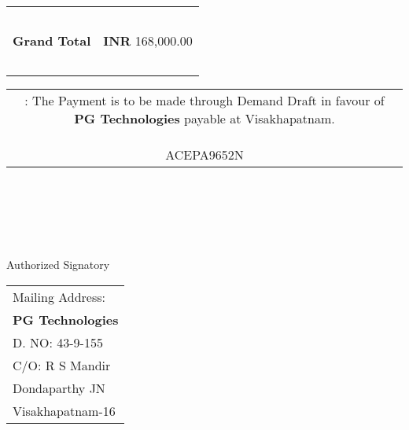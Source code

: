 \documentclass[11pt,a4]{article}
\begin{document}
\vspace*{0.25cm}

\hspace*{11.3cm}
\begin{tabular}{|c|r|}
\hline
\ & \\
{\bf Grand Total} & {\bf INR} 168,000.00 \\
\ & \\
\hline
\end{tabular}

\vspace*{-1.45cm}
\hspace*{-0.75cm}
\begin{tabular}{c}
\parbox{4in}{ : The Payment is to be made through Demand Draft in favour of {\bf PG Technologies} payable at Visakhapatnam. \\ \\
 ACEPA9652N}\\
\end{tabular}
\vspace*{75pt}


 \\ \\ \\ \\ \\
 \hspace*{0.2cm}Authorized Signatory
\vspace*{-71pt}
\begin{flushright}
\begin{tabular}{l}
Mailing Address:\\
{\bf PG Technologies}\\
D. NO: 43-9-155\\
C/O: R  S Mandir\\
Dondaparthy JN\\ 
Visakhapatnam-16\\
\end{tabular}
\end{flushright}
\end{document}
